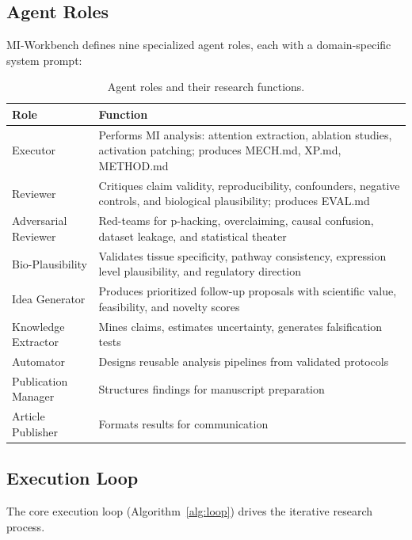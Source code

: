 \documentclass[10pt]{article}
\begin{document}
\subsection{Agent Roles}

MI-Workbench defines nine specialized agent roles, each with a domain-specific system prompt:

\begin{table}[t]
\centering
\small
\caption{Agent roles and their research functions.}
\label{tab:roles}
\begin{tabular}{@{}lp{7.5cm}@{}}
\toprule
\textbf{Role} & \textbf{Function} \\
\midrule
Executor & Performs MI analysis: attention extraction, ablation studies, activation patching; produces MECH.md, XP.md, METHOD.md \\
Reviewer & Critiques claim validity, reproducibility, confounders, negative controls, and biological plausibility; produces EVAL.md \\
Adversarial Reviewer & Red-teams for p-hacking, overclaiming, causal confusion, dataset leakage, and statistical theater \\
Bio-Plausibility & Validates tissue specificity, pathway consistency, expression level plausibility, and regulatory direction \\
Idea Generator & Produces prioritized follow-up proposals with scientific value, feasibility, and novelty scores \\
Knowledge Extractor & Mines claims, estimates uncertainty, generates falsification tests \\
Automator & Designs reusable analysis pipelines from validated protocols \\
Publication Manager & Structures findings for manuscript preparation \\
Article Publisher & Formats results for communication \\
\bottomrule
\end{tabular}
\end{table}

\subsection{Execution Loop}
\label{sec:loop}

The core execution loop (Algorithm~\ref{alg:loop}) drives the iterative research process.
\end{document}
